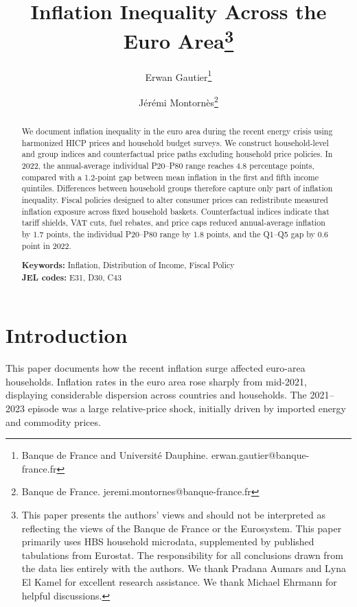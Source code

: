 \documentclass[11pt]{article}
\title{Inflation Inequality Across the Euro Area\thanks{This paper presents the authors' views and should not be interpreted as reflecting the views of
 the Banque de France or the Eurosystem. This paper primarily uses HBS household microdata, supplemented by published tabulations from
 Eurostat. The responsibility for all conclusions drawn from the data lies entirely with the
 authors. We thank Pradana Aumars and Lyna El Kamel for excellent research assistance. We thank Michael Ehrmann for helpful discussions.}}
\author{Erwan Gautier\thanks{\quad Banque de France and Université Dauphine. erwan.gautier@banque-france.fr} \and Jérémi Montornès\thanks{\quad Banque de France. jeremi.montornes@banque-france.fr}}
\begin{document}
\maketitle

\begin{abstract}
We document inflation inequality in the euro area during the recent energy crisis using harmonized
HICP prices and household budget surveys. We construct household-level and group indices and counterfactual price paths excluding
household price policies. In 2022, the annual-average individual P20--P80 range reaches 4.8 percentage
points, compared with a 1.2-point gap between mean inflation in the first and fifth income quintiles.
Differences between household groups therefore capture only part of inflation inequality.
Fiscal policies designed to alter consumer prices can redistribute measured inflation exposure
across fixed household baskets. Counterfactual indices indicate that tariff shields, VAT cuts, fuel
rebates, and price caps reduced annual-average inflation by 1.7 points, the individual P20--P80
range by 1.8 points, and the Q1--Q5 gap by 0.6 point in 2022.

\vspace{1em}

\noindent \textbf{Keywords:} Inflation, Distribution of Income, Fiscal Policy\\
\noindent \textbf{JEL codes:} E31, D30, C43

\end{abstract}

\newpage



\section*{Introduction}

This paper documents how the recent inflation surge affected euro-area households. Inflation
rates in the euro area rose sharply from mid-2021, displaying considerable dispersion
across countries and households. The 2021--2023 episode was
a large relative-price shock, initially driven by imported energy and commodity prices.


\end{document}
